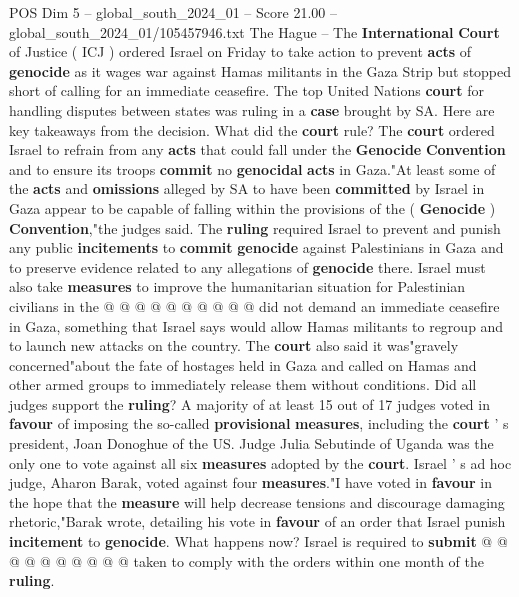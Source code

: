 \begin{textsample}{POS Dim 5 – global\_south\_2024\_01 – Score 21.00 – global\_south\_2024\_01/105457946.txt}  \label{ex:f5_pos_005}
The Hague -- The \textbf{International} \textbf{Court} of Justice ( ICJ ) ordered Israel on Friday to take action to prevent \textbf{acts} of \textbf{genocide} as it wages war against Hamas militants in the Gaza Strip but stopped short of calling for an immediate ceasefire.
The top United Nations \textbf{court} for handling disputes between states was ruling in a \textbf{case} brought by SA.
Here are key takeaways from the decision.
What did the \textbf{court} rule?
The \textbf{court} ordered Israel to refrain from any \textbf{acts} that could fall under the \textbf{Genocide} \textbf{Convention} and to ensure its troops \textbf{commit} no \textbf{genocidal} \textbf{acts} in Gaza."At least some of the \textbf{acts} and \textbf{omissions} alleged by SA to have been \textbf{committed} by Israel in Gaza appear to be capable of falling within the provisions of the ( \textbf{Genocide} ) \textbf{Convention},"the judges said.
The \textbf{ruling} required Israel to prevent and punish any public \textbf{incitements} to \textbf{commit} \textbf{genocide} against Palestinians in Gaza and to preserve evidence related to any allegations of \textbf{genocide} there.
Israel must also take \textbf{measures} to improve the humanitarian situation for Palestinian civilians in the @ @ @ @ @ @ @ @ @ @ did not demand an immediate ceasefire in Gaza, something that Israel says would allow Hamas militants to regroup and to launch new attacks on the country.
The \textbf{court} also said it was"gravely concerned"about the fate of hostages held in Gaza and called on Hamas and other armed groups to immediately release them without conditions.
Did all judges support the \textbf{ruling}?
A majority of at least 15 out of 17 judges voted in \textbf{favour} of imposing the so-called \textbf{provisional} \textbf{measures}, including the \textbf{court} ' s president, Joan Donoghue of the US.
Judge Julia Sebutinde of Uganda was the only one to vote against all six \textbf{measures} adopted by the \textbf{court}.
Israel ' s ad hoc judge, Aharon Barak, voted against four \textbf{measures}."I have voted in \textbf{favour} in the hope that the \textbf{measure} will help decrease tensions and discourage damaging rhetoric,"Barak wrote, detailing his vote in \textbf{favour} of an order that Israel punish \textbf{incitement} to \textbf{genocide}.
What happens now?
Israel is required to \textbf{submit} @ @ @ @ @ @ @ @ @ @ taken to comply with the orders within one month of the \textbf{ruling}.

\end{textsample}

